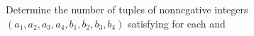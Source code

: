 Determine the number of tuples of nonnegative integers $ (a_1,a_2,a_3,a_4,b_1,b_2,b_3,b_4)$ satisfying  for each  and 